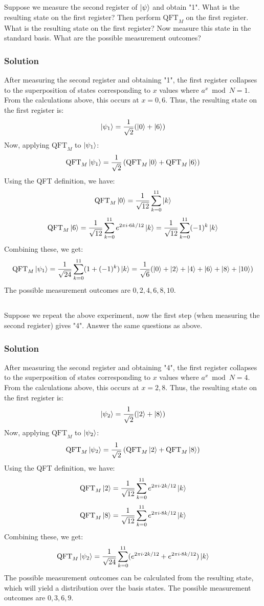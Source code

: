 \documentclass[12pt]{article} %
\begin{document}
\subsection{}
Suppose we measure the second register of \(\ket{\psi}\) and obtain "1". What is the resulting state on the first register? Then perform \(\text{QFT}_M\) on the first register. What is the resulting state on the first register? Now measure this state in the standard basis. What are the possible measurement outcomes?
\subsubsection*{Solution}
After measuring the second register and obtaining "1", the first register collapses to the superposition of states corresponding to \(x\) values where \(a^x \bmod N = 1\). From the calculations above, this occurs at \(x = 0, 6\). Thus, the resulting state on the first register is:
\[\ket{\psi_1} = \frac{1}{\sqrt{2}} (\ket{0} + \ket{6})\]
Now, applying \(\text{QFT}_M\) to \(\ket{\psi_1}\):
\[\text{QFT}_M \ket{\psi_1} = \frac{1}{\sqrt{2}} \left( \text{QFT}_M \ket{0} + \text{QFT}_M \ket{6} \right)\]
Using the QFT definition, we have:
\[\text{QFT}_M \ket{0} = \frac{1}{\sqrt{12}} \sum_{k=0}^{11} \ket{k}\]
\[\text{QFT}_M \ket{6} = \frac{1}{\sqrt{12}} \sum_{k=0}^{11} e^{2\pi i \cdot 6k/12} \ket{k} = \frac{1}{\sqrt{12}} \sum_{k=0}^{11} (-1)^k \ket{k}\]
Combining these, we get:
\[\text{QFT}_M \ket{\psi_1} = \frac{1}{\sqrt{24}} \sum_{k=0}^{11} (1 + (-1)^k) \ket{k} = \frac{1}{\sqrt{6}} (\ket{0} + \ket{2} + \ket{4} + \ket{6} + \ket{8} + \ket{10})\]
The possible measurement outcomes are \(0, 2, 4, 6, 8, 10\).
\subsection{}
Suppose we repeat the above experiment, now the first step (when measuring the second register) gives "4". Answer the same questions as above.
\subsubsection*{Solution}
After measuring the second register and obtaining "4", the first register collapses to the superposition of states corresponding to \(x\) values where \(a^x \bmod N = 4\). From the calculations above, this occurs at \(x = 2, 8\). Thus, the resulting state on the first register is:
\[\ket{\psi_2} = \frac{1}{\sqrt{2}} (\ket{2} + \ket{8})\]
Now, applying \(\text{QFT}_M\) to \(\ket{\psi_2}\):
\[\text{QFT}_M \ket{\psi_2} = \frac{1}{\sqrt{2}} \left( \text{QFT}_M \ket{2} + \text{QFT}_M \ket{8} \right)\]
Using the QFT definition, we have:
\[\text{QFT}_M \ket{2} = \frac{1}{\sqrt{12}} \sum_{k=0}^{11} e^{2\pi i \cdot 2k/12} \ket{k}\]
\[\text{QFT}_M \ket{8} = \frac{1}{\sqrt{12}} \sum_{k=0}^{11} e^{2\pi i \cdot 8k/12} \ket{k}\]
Combining these, we get:
\[\text{QFT}_M \ket{\psi_2} = \frac{1}{\sqrt{24}} \sum_{k=0}^{11} (e^{2\pi i \cdot 2k/12} + e^{2\pi i \cdot 8k/12}) \ket{k}\]
The possible measurement outcomes can be calculated from the resulting state, which will yield a distribution over the basis states. The possible measurement outcomes are \(0, 3, 6, 9\).
\end{document}
